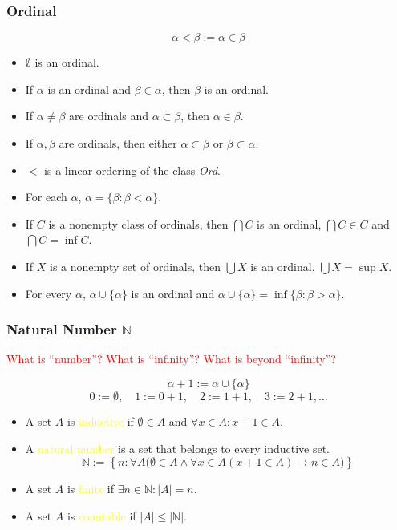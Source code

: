 \documentclass[UTF8,aspectratio=43,11pt,colorlinks,compress,openany]{beamer}%
\begin{document}
\begin{frame}\frametitle{Ordinal}
	\[\alpha<\beta:=\alpha\in\beta\]
	\begin{itemize}
		\item $\emptyset$ is an ordinal.
		\item If $\alpha$ is an ordinal and $\beta\in\alpha$, then $\beta$ is an ordinal.
		\item If $\alpha\neq\beta$ are ordinals and $\alpha\subset\beta$, then $\alpha\in\beta$.
		\item If $\alpha,\beta$ are ordinals, then either $\alpha\subset\beta$ or $\beta\subset\alpha$.
		\item $<$ is a linear ordering of the class \emph{Ord}.
		\item For each $\alpha$, $\alpha=\{\beta:\beta<\alpha\}$.
		\item If $C$ is a nonempty class of ordinals, then $\bigcap C$ is an ordinal, $\bigcap C\in C$ and $\bigcap C=\inf C$.
		\item If $X$ is a nonempty set of ordinals, then $\bigcup X$ is an ordinal, $\bigcup X=\sup X$.
		\item For every $\alpha$, $\alpha\cup\{\alpha\}$ is an ordinal and $\alpha\cup\{\alpha\}=\inf\{\beta:\beta>\alpha\}$.
	\end{itemize}
\end{frame}

\begin{frame}\frametitle{Natural Number $\mathbb{N}$}
	\begin{block}{}
		\centering\textcolor{red}{What is ``number''? What is ``infinity''? What is beyond ``infinity''?}
	\end{block}
	\[\alpha+1:=\alpha\cup\{\alpha\}\]
	\[0:=\emptyset,\quad 1:=0+1,\quad 2:=1+1,\quad 3:=2+1, \dots\]
	\begin{itemize}
		\item A set $A$ is \textcolor{yellow}{inductive} if $\emptyset\in A$ and $\forall x\in A: x+1\in A$.
		\item A \textcolor{yellow}{natural number} is a set that belongs to every inductive set.
		\[\mathbb{N}:=\left\{n: \forall A\big(\emptyset\in A\wedge \forall x\in A(x+1\in A)\to n\in A\big)\right\}\]
		\item A set $A$ is \textcolor{yellow}{finite} if $\exists n\in\mathbb{N}: |A|=n$.
		\item A set $A$ is \textcolor{yellow}{countable} if $|A|\leq|\mathbb{N}|$.
	\end{itemize}
\end{frame}
\end{document}
